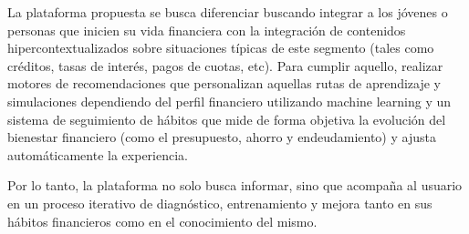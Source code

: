 La plataforma propuesta se busca diferenciar buscando integrar a los jóvenes o personas que inicien su vida financiera con la integración de contenidos hipercontextualizados sobre situaciones típicas de este segmento (tales como créditos, tasas de interés, pagos de cuotas, etc). Para cumplir aquello, realizar motores de recomendaciones que personalizan aquellas rutas de aprendizaje y simulaciones dependiendo del perfil financiero utilizando machine learning y un sistema de seguimiento de hábitos que mide de forma objetiva la evolución del bienestar financiero (como el presupuesto, ahorro y endeudamiento) y ajusta automáticamente la experiencia. 

Por lo tanto, la plataforma no solo busca informar, sino que acompaña al usuario en un proceso iterativo de diagnóstico, entrenamiento y mejora tanto en sus hábitos financieros como en el conocimiento del mismo.